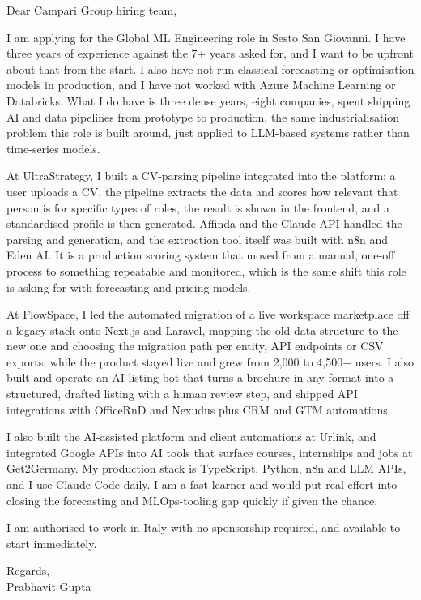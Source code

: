 \documentclass[a4paper,11pt]{article}
\begin{document}
Dear Campari Group hiring team,

I am applying for the Global ML Engineering role in Sesto San Giovanni. I have three years of experience against the 7+ years asked for, and I want to be upfront about that from the start. I also have not run classical forecasting or optimisation models in production, and I have not worked with Azure Machine Learning or Databricks. What I do have is three dense years, eight companies, spent shipping AI and data pipelines from prototype to production, the same industrialisation problem this role is built around, just applied to LLM-based systems rather than time-series models.

At UltraStrategy, I built a CV-parsing pipeline integrated into the platform: a user uploads a CV, the pipeline extracts the data and scores how relevant that person is for specific types of roles, the result is shown in the frontend, and a standardised profile is then generated. Affinda and the Claude API handled the parsing and generation, and the extraction tool itself was built with n8n and Eden AI. It is a production scoring system that moved from a manual, one-off process to something repeatable and monitored, which is the same shift this role is asking for with forecasting and pricing models.

At FlowSpace, I led the automated migration of a live workspace marketplace off a legacy stack onto Next.js and Laravel, mapping the old data structure to the new one and choosing the migration path per entity, API endpoints or CSV exports, while the product stayed live and grew from 2,000 to 4,500+ users. I also built and operate an AI listing bot that turns a brochure in any format into a structured, drafted listing with a human review step, and shipped API integrations with OfficeRnD and Nexudus plus CRM and GTM automations.

I also built the AI-assisted platform and client automations at Urlink, and integrated Google APIs into AI tools that surface courses, internships and jobs at Get2Germany. My production stack is TypeScript, Python, n8n and LLM APIs, and I use Claude Code daily. I am a fast learner and would put real effort into closing the forecasting and MLOps-tooling gap quickly if given the chance.

I am authorised to work in Italy with no sponsorship required, and available to start immediately.

Regards,\\
Prabhavit Gupta
\end{document}
